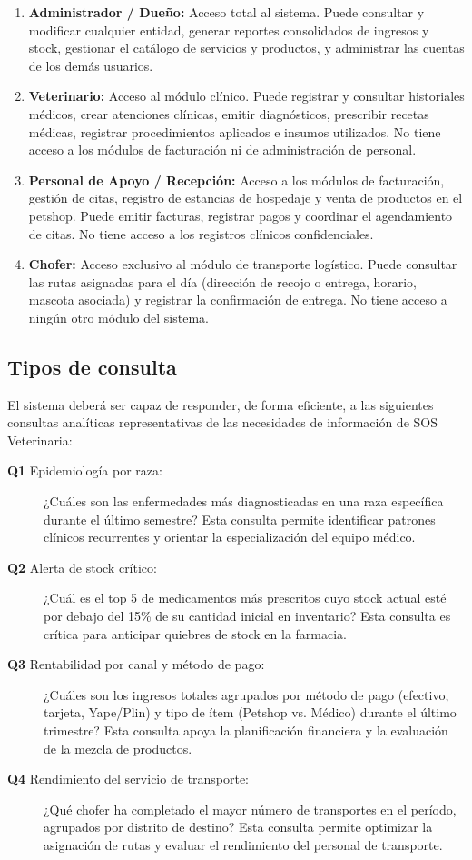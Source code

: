 \begin{enumerate}
	\item \textbf{Administrador / Dueño:} Acceso total al sistema. Puede consultar y modificar cualquier entidad, generar reportes consolidados de ingresos y stock, gestionar el catálogo de servicios y productos, y administrar las cuentas de los demás usuarios.
	\item \textbf{Veterinario:} Acceso al módulo clínico. Puede registrar y consultar historiales médicos, crear atenciones clínicas, emitir diagnósticos, prescribir recetas médicas, registrar procedimientos aplicados e insumos utilizados. No tiene acceso a los módulos de facturación ni de administración de personal.
	\item \textbf{Personal de Apoyo / Recepción:} Acceso a los módulos de facturación, gestión de citas, registro de estancias de hospedaje y venta de productos en el petshop. Puede emitir facturas, registrar pagos y coordinar el agendamiento de citas. No tiene acceso a los registros clínicos confidenciales.
	\item \textbf{Chofer:} Acceso exclusivo al módulo de transporte logístico. Puede consultar las rutas asignadas para el día (dirección de recojo o entrega, horario, mascota asociada) y registrar la confirmación de entrega. No tiene acceso a ningún otro módulo del sistema.
\end{enumerate}

\subsection{Tipos de consulta}

El sistema deberá ser capaz de responder, de forma eficiente, a las siguientes consultas analíticas representativas de las necesidades de información de SOS Veterinaria:

\begin{description}
	\item[\textbf{Q1} Epidemiología por raza:] ¿Cuáles son las enfermedades más diagnosticadas en una raza específica durante el último semestre? Esta consulta permite identificar patrones clínicos recurrentes y orientar la especialización del equipo médico.
	\item[\textbf{Q2} Alerta de stock crítico:] ¿Cuál es el top 5 de medicamentos más prescritos cuyo stock actual esté por debajo del 15\% de su cantidad inicial en inventario? Esta consulta es crítica para anticipar quiebres de stock en la farmacia.
	\item[\textbf{Q3} Rentabilidad por canal y método de pago:] ¿Cuáles son los ingresos totales agrupados por método de pago (efectivo, tarjeta, Yape/Plin) y tipo de ítem (Petshop vs. Médico) durante el último trimestre? Esta consulta apoya la planificación financiera y la evaluación de la mezcla de productos.
	\item[\textbf{Q4} Rendimiento del servicio de transporte:] ¿Qué chofer ha completado el mayor número de transportes en el período, agrupados por distrito de destino? Esta consulta permite optimizar la asignación de rutas y evaluar el rendimiento del personal de transporte.
\end{description}

